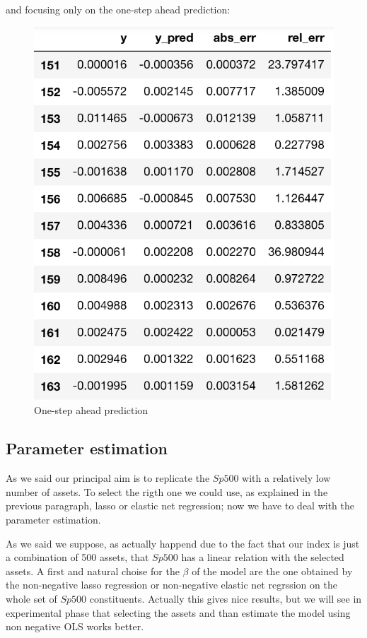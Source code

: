 \documentclass{article}%
\begin{document}
and focusing only on the one-step ahead prediction:
\begin{figure}[h!]
  \centering
  \includegraphics[scale=0.6]{pred_step1.png}
  \caption{One-step ahead prediction}
  \label{err_step}
\end{figure}



\subsection{Parameter estimation}
As we said our principal aim is to replicate the $Sp500$ with a relatively low number of assets. To select the rigth one we could use, as explained in the previous paragraph, lasso or elastic net regression; now we have to deal with the parameter estimation.

As we said we suppose, as actually happend due to the fact that our index is just a combination of 500 assets, that $Sp500$ has a linear relation with the selected assets. A first and natural choise for the $\beta$ of the model are the one obtained by the non-negative lasso regression or non-negative elastic net regrssion on the whole set of $Sp500$ constituents. Actually this gives nice results, but we will see in experimental phase that selecting the assets and than estimate the model using non negative OLS works better. 
\\
\end{document}
